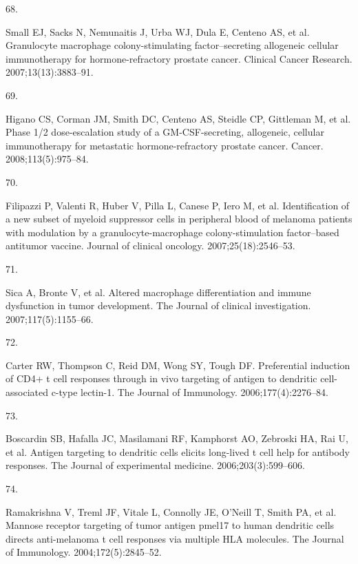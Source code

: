 \documentclass[
]{article}
\newlength{\cslhangindent}
\newlength{\csllabelwidth}
\newenvironment{CSLReferences}[2] %
 {\begin{list}{}{%
  \setlength{\itemindent}{0pt}
  \setlength{\leftmargin}{0pt}
  \setlength{\parsep}{0pt}
  \ifodd #1
   \setlength{\leftmargin}{\cslhangindent}
   \setlength{\itemindent}{-1\cslhangindent}
  \fi
  \setlength{\itemsep}{#2\baselineskip}}}
 {\end{list}}
\newcommand{\CSLLeftMargin}[1]{\parbox[t]{\csllabelwidth}{\strut#1\strut}}
\newcommand{\CSLRightInline}[1]{\parbox[t]{\linewidth - \csllabelwidth}{\strut#1\strut}}
\begin{document}
\begin{CSLReferences}{0}{1}
\CSLLeftMargin{68. }%
\CSLRightInline{Small EJ, Sacks N, Nemunaitis J, Urba WJ, Dula E,
Centeno AS, et al. Granulocyte macrophage colony-stimulating
factor--secreting allogeneic cellular immunotherapy for
hormone-refractory prostate cancer. Clinical Cancer Research.
2007;13(13):3883--91. }

\CSLLeftMargin{69. }%
\CSLRightInline{Higano CS, Corman JM, Smith DC, Centeno AS, Steidle CP,
Gittleman M, et al. Phase 1/2 dose-escalation study of a
GM-CSF-secreting, allogeneic, cellular immunotherapy for metastatic
hormone-refractory prostate cancer. Cancer. 2008;113(5):975--84. }

\CSLLeftMargin{70. }%
\CSLRightInline{Filipazzi P, Valenti R, Huber V, Pilla L, Canese P, Iero
M, et al. Identification of a new subset of myeloid suppressor cells in
peripheral blood of melanoma patients with modulation by a
granulocyte-macrophage colony-stimulation factor--based antitumor
vaccine. Journal of clinical oncology. 2007;25(18):2546--53. }

\CSLLeftMargin{71. }%
\CSLRightInline{Sica A, Bronte V, et al. Altered macrophage
differentiation and immune dysfunction in tumor development. The Journal
of clinical investigation. 2007;117(5):1155--66. }

\CSLLeftMargin{72. }%
\CSLRightInline{Carter RW, Thompson C, Reid DM, Wong SY, Tough DF.
Preferential induction of CD4+ t cell responses through in vivo
targeting of antigen to dendritic cell-associated c-type lectin-1. The
Journal of Immunology. 2006;177(4):2276--84. }

\CSLLeftMargin{73. }%
\CSLRightInline{Boscardin SB, Hafalla JC, Masilamani RF, Kamphorst AO,
Zebroski HA, Rai U, et al. Antigen targeting to dendritic cells elicits
long-lived t cell help for antibody responses. The Journal of
experimental medicine. 2006;203(3):599--606. }

\CSLLeftMargin{74. }%
\CSLRightInline{Ramakrishna V, Treml JF, Vitale L, Connolly JE, O'Neill
T, Smith PA, et al. Mannose receptor targeting of tumor antigen pmel17
to human dendritic cells directs anti-melanoma t cell responses via
multiple HLA molecules. The Journal of Immunology. 2004;172(5):2845--52.
}


\end{CSLReferences}
\end{document}
